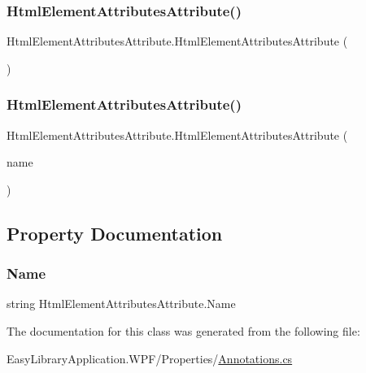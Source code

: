\subsubsection{\texorpdfstring{Html\+Element\+Attributes\+Attribute()}{HtmlElementAttributesAttribute()}\hspace{0.1cm}{\footnotesize\ttfamily [1/2]}}
{\footnotesize\ttfamily Html\+Element\+Attributes\+Attribute.\+Html\+Element\+Attributes\+Attribute (\begin{DoxyParamCaption}{ }\end{DoxyParamCaption})}

\mbox{\label{class_html_element_attributes_attribute_a4d6a9dea9e671b8e33cc4e87e4a8c88e}} 
\subsubsection{\texorpdfstring{Html\+Element\+Attributes\+Attribute()}{HtmlElementAttributesAttribute()}\hspace{0.1cm}{\footnotesize\ttfamily [2/2]}}
{\footnotesize\ttfamily Html\+Element\+Attributes\+Attribute.\+Html\+Element\+Attributes\+Attribute (\begin{DoxyParamCaption}\item[{\mbox{[}\+Not\+Null\mbox{]} string}]{name }\end{DoxyParamCaption})}



\subsection{Property Documentation}
\mbox{\label{class_html_element_attributes_attribute_a6d108098ab54c1770cb01df2e1051fd7}} 
\subsubsection{\texorpdfstring{Name}{Name}}
{\footnotesize\ttfamily string Html\+Element\+Attributes\+Attribute.\+Name\hspace{0.3cm}{\ttfamily [get]}}



The documentation for this class was generated from the following file\+:\begin{DoxyCompactItemize}
\item 
Easy\+Library\+Application.\+W\+P\+F/\+Properties/\mbox{\hyperlink{_annotations_8cs}{Annotations.\+cs}}\end{DoxyCompactItemize}

